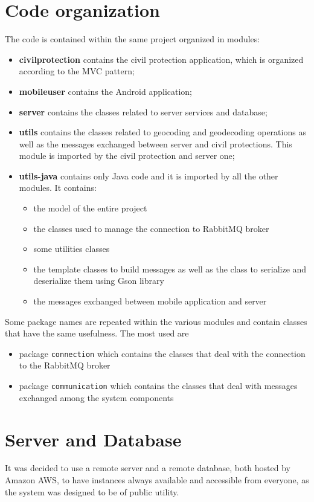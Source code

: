 \documentclass[a4paper,12pt]{report}
\begin{document}
\section{Code organization}
The code is contained within the same project organized in modules:
\begin{itemize}
\item \textbf{civilprotection} contains the civil protection application, which is organized according to the MVC pattern; 
\item \textbf{mobileuser} contains the Android application; 
\item \textbf{server} contains the classes related to server services and database;
\item \textbf{utils} contains the classes related to geocoding and geodecoding operations as well as the messages exchanged between server and civil protections. This module is imported by the civil protection and server one; 
\item \textbf{utils-java} contains only Java code and it is imported by all the other modules. It contains: 
\begin{itemize}
\item the model of the entire project
\item the classes used to manage the connection to RabbitMQ broker
\item some utilities classes
\item the template classes to build messages as well as the class to serialize and deserialize them using Gson library
\item the messages exchanged between mobile application and server
\end{itemize}
\end{itemize}

Some package names are repeated within the various modules and contain classes that have the same usefulness. The most used are
\begin{itemize}
\item package \texttt{connection} which contains the classes that deal with the connection to the RabbitMQ broker
\item package \texttt{communication} which contains the classes that deal with messages exchanged among the system components
\end{itemize}

\section{Server and Database}
It was decided to use a remote server and a remote database, both hosted by Amazon AWS, to have instances always available and accessible from everyone, as the system was designed to be of public utility.
\end{document}
